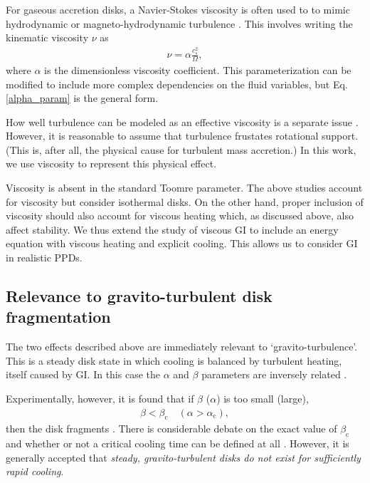 \documentclass[iop, numberedappendix]{emulateapj}
\begin{document}
For gaseous accretion disks, a Navier-Stokes viscosity is often used to 
to mimic hydrodynamic or magneto-hydrodynamic turbulence
\citep{shakura73}. This involves writing the
kinematic viscosity $\nu$ as  
\begin{align}\label{alpha_param}
  \nu  = \alpha \frac{c_s^2}{\Omega}, %
\end{align}
where $\alpha$ is the dimensionless viscosity
coefficient. This
parameterization can be modified to include more complex dependencies on the
fluid variables, but Eq. \ref{alpha_param} is the general form. 

How well turbulence can be modeled as an effective viscosity is a
separate issue \citep{balbus99}. However, it is  
reasonable to assume that turbulence frustates rotational 
support. (This is, after all, the physical cause for turbulent mass
accretion.) In this work, we use viscosity to represent this physical
effect.  

Viscosity is absent in the standard Toomre parameter. The above
studies account for viscosity but consider isothermal disks. On the
other hand, proper inclusion of viscosity should also account for
viscous heating which, as discussed above, also affect stability. 
We thus extend the study of viscous GI to include an energy equation
with viscous heating and explicit cooling. This allows us to consider
GI in realistic PPDs.  



\subsection{Relevance to gravito-turbulent disk fragmentation}%
The two effects described above are immediately relevant to
`gravito-turbulence'. This is a steady disk state in which cooling is
balanced by turbulent heating, itself caused by GI. In this case 
the $\alpha$ and $\beta$ parameters are inversely related
\citep{gammie01}.   

Experimentally, however, it is found that if $\beta$ ($\alpha$) is
too small (large), 
\begin{align}
  \beta < \beta_\mathrm{c} \quad
  \left(\alpha>\alpha_\mathrm{c}\right), 
\end{align}
then the disk fragments \citep{gammie01,rice05,rice11}. 
There is considerable debate on the exact value of $\beta_\mathrm{c}$
and whether or not a critical cooling time can 
be defined at all \citep{meru11,meru12,paardekooper12,hopkins13}. However, it is
generally accepted that \emph{steady, gravito-turbulent disks do not
  exist for sufficiently rapid cooling}. 
\end{document}
